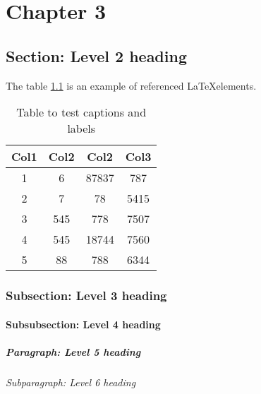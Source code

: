 
\chapter{Chapter 3}
\section{Section: Level 2 heading}

The table \ref{table:1} is an example of referenced \LaTeX elements.
 
\begin{table}[h!]
\centering
\begin{tabular}{||c c c c||} 
 \hline
 Col1 & Col2 & Col2 & Col3 \\ [0.5ex] 
 \hline\hline
 1 & 6 & 87837 & 787 \\ 
 2 & 7 & 78 & 5415 \\
 3 & 545 & 778 & 7507 \\
 4 & 545 & 18744 & 7560 \\
 5 & 88 & 788 & 6344 \\ [1ex] 
 \hline
\end{tabular}
\caption{Table to test captions and labels}
\label{table:1}
\end{table}

\subsection{Subsection: Level 3 heading}
\subsubsection{Subsubsection: Level 4 heading}
\paragraph{Paragraph: Level 5 heading}
\subparagraph{Subparagraph: Level 6 heading}


